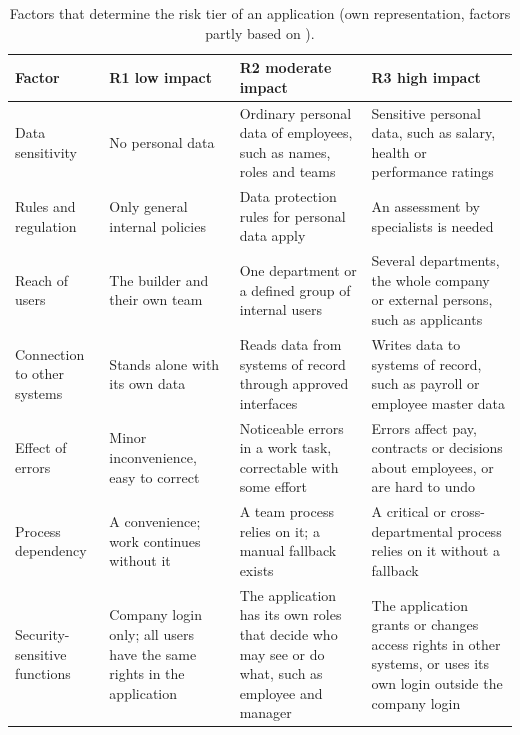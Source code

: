 \documentclass[10pt,a4paper]{article}
\begin{document}
\begin{table}[H]
    \centering
    \small
    \caption{Factors that determine the risk tier of an application
    (own representation, factors partly based on \textcite{kang2026}).}
    \label{tab:tier-factors}
    \begin{tabular}{@{}p{2.8cm} p{3.6cm} p{3.6cm} p{3.6cm}@{}}
    \toprule
    \textbf{Factor} & \textbf{R1 low impact} & \textbf{R2 moderate
        impact} & \textbf{R3 high impact} \\
    \midrule
    Data sensitivity & No personal data & Ordinary personal data of
        employees, such as names, roles and teams & Sensitive personal
        data, such as salary, health or performance ratings \\
    \addlinespace
    Rules and regulation & Only general internal policies & Data
        protection rules for personal data apply & An assessment by
        specialists is needed \\
    \addlinespace
    Reach of users & The builder and their own team & One department or
        a defined group of internal users & Several departments, the
        whole company or external persons, such as applicants \\
    \addlinespace
    Connection to other systems & Stands alone with its own data & Reads
        data from systems of record through approved interfaces & Writes
        data to systems of record, such as payroll or employee master
        data \\
    \addlinespace
    Effect of errors & Minor inconvenience, easy to correct & Noticeable
        errors in a work task, correctable with some effort & Errors
        affect pay, contracts or decisions about employees, or are hard
        to undo \\
    \addlinespace
    Process dependency & A convenience; work continues without it & A
        team process relies on it; a manual fallback exists & A critical
        or cross-departmental process relies on it without a fallback \\
    \addlinespace
    Security-sensitive functions & Company login only; all users have
        the same rights in the application & The application has its own
        roles that decide who may see or do what, such as employee and
        manager & The application grants or changes access rights in
        other systems, or uses its own login outside the company login \\
    \bottomrule
    \end{tabular}
\end{table}
\end{document}

